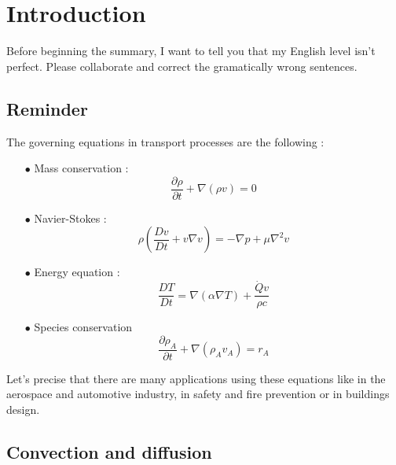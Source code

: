 
\chapter{Introduction}
Before beginning the summary, I want to tell you that my English level isn't perfect. Please collaborate and correct the gramatically wrong sentences.\\

\section{Reminder}
	The governing equations in transport processes are the following :
	\begin{itemize}
	\item[$\bullet$] Mass conservation : 
		\begin{equation}
			\frac{\partial \rho}{\partial t} + \nabla (\rho v) = 0
		\end{equation}
	\item[$\bullet$] Navier-Stokes :
		\begin{equation}
			\rho \left(\frac{Dv}{Dt} + v \nabla v \right) = -\nabla p + \mu \nabla ^2 v
		\end{equation}		 
	\item[$\bullet$] Energy equation :
		\begin{equation}
			\frac{DT}{Dt} = \nabla (\alpha \nabla T) + \frac{\dot{Q}v}{\rho c}
		\end{equation}
	\item[$\bullet$] Species conservation
		\begin{equation}
			\frac{\partial \rho _A}{\partial t} + \nabla (\rho _A v_A) = r_A
		\end{equation}
	\end{itemize}
	Let's precise that there are many applications using these equations like in the aerospace and automotive industry, in safety and fire prevention or in buildings design.  
	
\section{Convection and diffusion}
